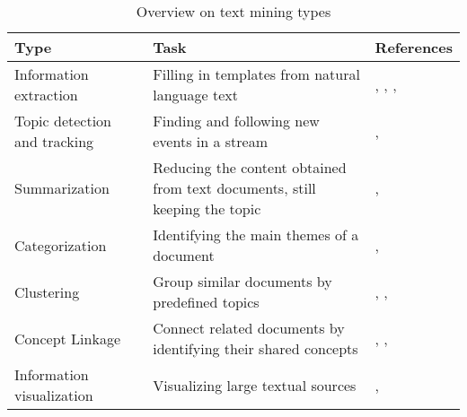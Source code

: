 \begin{table}[!h]
\centering
\caption{Overview on text mining types}
\label{tab:text-mining-overview}
\vspace{5pt}
\begin{tabular}{m{4cm}m{5cm}m{4cm}}
\toprule
\textbf{Type}                         & \textbf{Task}                                                                                                                   & \textbf{References}                                                                                           \\ \midrule
Information extraction       & Filling in templates from natural language text                                                                        & \cite{cowie1996information}, \cite{mooney1999relational}, \cite{seymore1999learning}, \cite{banko2007open} \\ %
Topic detection and tracking & Finding and following new events in a stream                                                                           & \cite{Allan1998}, \cite{wayne2000multilingual}                                                  \\ %
Summarization                & Reducing the content obtained from text documents, still keeping the topic                                             & \cite{aggarwal2012mining}, \cite{gupta2009survey}                                                    \\ %
Categorization               & Identifying the main themes of a document                                                                              & \cite{sebastiani2002machine}, \cite{joachims1998text}                                                \\ %
Clustering                   & Group similar documents by predefined topics                                                                           & \cite{zhao2001criterion}, \cite{fung2003hierarchical}, \cite{aggarwal2012mining}                     \\ %
Concept Linkage              & Connect related documents by identifying their shared concepts                                                         & \cite{maedche2000mining}, \cite{fan2006tapping}, \cite{gupta2009survey}                             \\ %
Information visualization    & Visualizing large textual sources                                                                                      & \cite{wong1999visualizing}, \cite{Mostafa2013}                                                       \\ %

\end{tabular}
\end{table}
